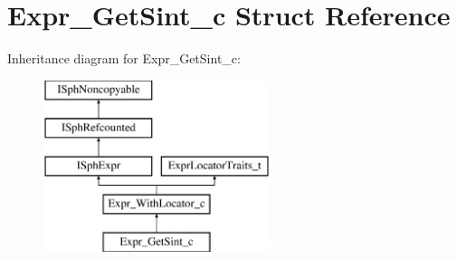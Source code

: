 \hypertarget{structExpr__GetSint__c}{\section{Expr\-\_\-\-Get\-Sint\-\_\-c Struct Reference}
\label{structExpr__GetSint__c}
}
Inheritance diagram for Expr\-\_\-\-Get\-Sint\-\_\-c\-:\begin{figure}[H]
\begin{center}
\leavevmode
\includegraphics[height=5.000000cm]{structExpr__GetSint__c}
\end{center}
\end{figure}

